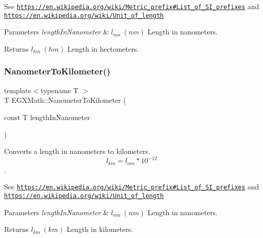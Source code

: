 See \href{https://en.wikipedia.org/wiki/Metric_prefix#List_of_SI_prefixes}{\tt https\+://en.\+wikipedia.\+org/wiki/\+Metric\+\_\+prefix\#\+List\+\_\+of\+\_\+\+S\+I\+\_\+prefixes} and \href{https://en.wikipedia.org/wiki/Unit_of_length}{\tt https\+://en.\+wikipedia.\+org/wiki/\+Unit\+\_\+of\+\_\+length} 
\begin{DoxyParams}{Parameters}
{\em length\+In\+Nanometer} & $ l_{nm}\ (nm)$ Length in nanometers. \\
\hline
\end{DoxyParams}
\begin{DoxyReturn}{Returns}
$ l_{hm}\ (hm)$ Length in hectometers. 
\end{DoxyReturn}
\mbox{\label{group___e_g_x_math-_conversions-_length_conversions-_nanometer-_s_i_gaadb5b2460069bb749412818e7aa6ee3b}} 
\subsubsection{\texorpdfstring{Nanometer\+To\+Kilometer()}{NanometerToKilometer()}}
{\footnotesize\ttfamily template$<$typename T $>$ \\
T E\+G\+X\+Math\+::\+Nanometer\+To\+Kilometer (\begin{DoxyParamCaption}\item[{const T}]{length\+In\+Nanometer }\end{DoxyParamCaption})}



Converts a length in nanometers to kilometers. \[ l_{km}=l_{nm} * 10^{-12} \]. 

See \href{https://en.wikipedia.org/wiki/Metric_prefix#List_of_SI_prefixes}{\tt https\+://en.\+wikipedia.\+org/wiki/\+Metric\+\_\+prefix\#\+List\+\_\+of\+\_\+\+S\+I\+\_\+prefixes} and \href{https://en.wikipedia.org/wiki/Unit_of_length}{\tt https\+://en.\+wikipedia.\+org/wiki/\+Unit\+\_\+of\+\_\+length} 
\begin{DoxyParams}{Parameters}
{\em length\+In\+Nanometer} & $ l_{nm}\ (nm)$ Length in nanometers. \\
\hline
\end{DoxyParams}
\begin{DoxyReturn}{Returns}
$ l_{km}\ (km)$ Length in kilometers. 
\end{DoxyReturn}
\mbox{\label{group___e_g_x_math-_conversions-_length_conversions-_nanometer-_s_i_gabe3584b4139cea97ebc372abf99fc63e}} 
